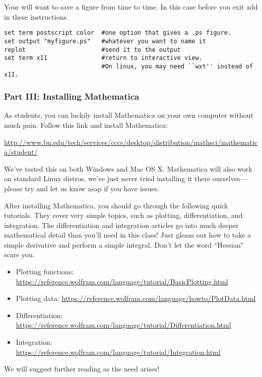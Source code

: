 \documentclass[pdftex,letterpaper,12pt]{article}
\newcommand{\<}{\langle}
\renewcommand{\>}{\rangle}
\begin{document}
Your will want to save a figure from time to time. In this case 
before  you exit add in these instructions.
\begin{verbatim}
set term postscript color  #one option that gives a .ps figure.
set output "myfigure.ps"   #whatever you want to name it
replot                     #send it to the output
set term x11               #return to interactive view.
                           #On linux, you may need ``wxt'' instead of x11.
\end{verbatim}


\subsubsection{Part III: Installing Mathematica}

As students, you can luckily install Mathematica on your own computer without much pain. Follow this link and install Mathematica:

\href{http://www.bu.edu/tech/services/cccs/desktop/distribution/mathsci/mathematica/student/}{http://www.bu.edu/tech/services/cccs/desktop/distribution/mathsci/mathematica/student/}

We've tested this on both Windows and Mac OS X. Mathematica will also work on standard Linux distros, we've just never tried installing it there ourselves---please try and let us know asap if you have issues. 

After installing Mathematica, you should go through the following quick tutorials. They cover very simple topics, such as plotting, differentiation, and integration. The differentiation and integration articles go into much deeper mathematical detail than you'll need in this class! Just gleam out how to take a simple derivative and perform a simple integral. Don't let the word ``Hessian" scare you. 

\begin{itemize}
\item Plotting functions: \url{https://reference.wolfram.com/language/tutorial/BasicPlotting.html}
\item Plotting data: \url{https://reference.wolfram.com/language/howto/PlotData.html}
\item Differentiation: \url{https://reference.wolfram.com/language/tutorial/Differentiation.html}
\item Integration: \url{https://reference.wolfram.com/language/tutorial/Integration.html}
\end{itemize}

We will suggest further reading as the need arises!
\end{document}
